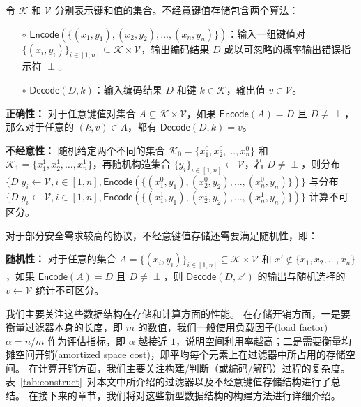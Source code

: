 \begin{definition}[不经意键值存储]\label{def:okvs}
    令 $\mathcal{K}$ 和 $\mathcal{V}$ 分别表示键和值的集合。不经意键值存储包含两个算法：
    \begin{itemize}
        \item[$\circ$] $\mathsf{Encode}(\{(x_1, y_1), (x_2, y_2), \dots, (x_n, y_n)\})$：输入一组键值对 $\{(x_i, y_i)\}_{i\in [1,n]}\subseteq \mathcal{K} \times \mathcal{V}$，输出编码结果 $D$ 或以可忽略的概率输出错误指示符 $\perp$。
        \item[$\circ$] $\mathsf{Decode}(D, k)$：输入编码结果 $D$ 和键 $k\in \mathcal{K}$，输出值 $v\in \mathcal{V}$。
    \end{itemize}

    \textbf{正确性：} 对于任意键值对集合 $A\subseteq \mathcal{K}\times \mathcal{V}$，如果 $\mathsf{Encode}(A) = D$ 且 $D\neq \perp$，那么对于任意的 $(k, v) \in A$，都有 $\mathsf{Decode}(D, k) = v$。

    \textbf{不经意性：} 随机给定两个不同的集合 $\mathcal{K}_0 = \{x_1^0, x_2^0, \dots, x_n^0\}$ 和 $\mathcal{K}_1 = \{x_1^1, x_2^1, \dots, x_n^1\}$，再随机构造集合 $\{y_i\}_{i\in [1,n]}\gets \mathcal{V}$，若 $D \neq \perp$，则分布 $\{D | y_i \gets \mathcal{V}, i\in [1,n], \mathsf{Encode}(\{(x_1^0, y_1), (x_2^0, y_2), \dots, (x_n^0, y_n)\})\}$ 与分布 $\{D | y_i \gets \mathcal{V}, i\in [1,n], \mathsf{Encode}(\{(x_1^1, y_1), (x_2^1, y_2), \dots, (x_n^1, y_n)\})\}$ 计算不可区分。

    对于部分安全需求较高的协议，不经意键值存储还需要满足随机性，即：

    \textbf{随机性：} 对于任意的集合 $A = \{(x_i, y_i)\}_{i\in [1,n]} \subseteq \mathcal{K} \times \mathcal{V}$ 和 $x' \notin \{x_1, x_2, \dots, x_n\}$，如果 $\mathsf{Encode}(A) = D$ 且 $D\neq \perp$，则 $\mathsf{Decode}(D, x')$ 的输出与随机选择的 $v\gets \mathcal{V}$ 统计不可区分。
\end{definition}

我们主要关注这些数据结构在存储和计算方面的性能。
在存储开销方面，一是要衡量过滤器本身的长度，即 $m$ 的数值，我们一般使用负载因子(load factor) $\alpha = n/m$ 作为评估指标，即 $\alpha$ 越接近 $1$，说明空间利用率越高；二是需要衡量均摊空间开销(amortized space cost)，即平均每个元素上在过滤器中所占用的存储空间。
在计算开销方面，我们主要关注构建/判断（或编码/解码）过程的复杂度。
表~\ref{tab:construct}~对本文中所介绍的过滤器以及不经意键值存储结构进行了总结。
在接下来的章节，我们将对这些新型数据结构的构建方法进行详细介绍。

